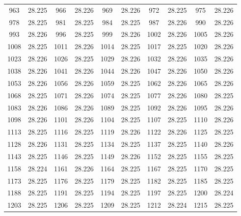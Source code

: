 \documentclass[12pt]{ctexart}
\numberwithin{equation}{section}
\begin{document}
\begin{longtable}{cc|cc|cc|cc|cc}
    963      & 28.225   & 966      & 28.226   & 969      & 28.226   & 972      & 28.225   & 975      & 28.226   \\
    978      & 28.225   & 981      & 28.225   & 984      & 28.225   & 987      & 28.226   & 990      & 28.226   \\
    993      & 28.226   & 996      & 28.225   & 999      & 28.226   & 1002     & 28.226   & 1005     & 28.226   \\
    1008     & 28.225   & 1011     & 28.226   & 1014     & 28.225   & 1017     & 28.225   & 1020     & 28.226   \\
    1023     & 28.226   & 1026     & 28.225   & 1029     & 28.226   & 1032     & 28.226   & 1035     & 28.226   \\
    1038     & 28.226   & 1041     & 28.226   & 1044     & 28.226   & 1047     & 28.226   & 1050     & 28.226   \\
    1053     & 28.226   & 1056     & 28.226   & 1059     & 28.225   & 1062     & 28.226   & 1065     & 28.226   \\
    1068     & 28.225   & 1071     & 28.226   & 1074     & 28.225   & 1077     & 28.226   & 1080     & 28.225   \\
    1083     & 28.226   & 1086     & 28.226   & 1089     & 28.225   & 1092     & 28.226   & 1095     & 28.226   \\
    1098     & 28.226   & 1101     & 28.226   & 1104     & 28.225   & 1107     & 28.225   & 1110     & 28.226   \\
    1113     & 28.225   & 1116     & 28.225   & 1119     & 28.226   & 1122     & 28.226   & 1125     & 28.225   \\
    1128     & 28.226   & 1131     & 28.225   & 1134     & 28.225   & 1137     & 28.225   & 1140     & 28.226   \\
    1143     & 28.225   & 1146     & 28.225   & 1149     & 28.226   & 1152     & 28.225   & 1155     & 28.225   \\
    1158     & 28.224   & 1161     & 28.226   & 1164     & 28.225   & 1167     & 28.225   & 1170     & 28.225   \\
    1173     & 28.225   & 1176     & 28.225   & 1179     & 28.225   & 1182     & 28.225   & 1185     & 28.225   \\
    1188     & 28.225   & 1191     & 28.225   & 1194     & 28.225   & 1197     & 28.225   & 1200     & 28.224   \\
    1203     & 28.225   & 1206     & 28.225   & 1209     & 28.225   & 1212     & 28.224   & 1215     & 28.225   \\

\end{longtable}
\end{document}
